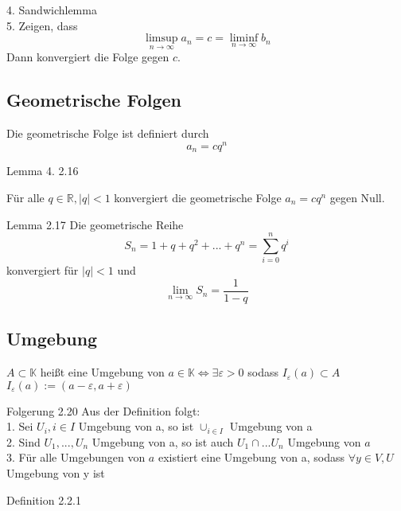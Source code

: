 \documentclass[smallheadings,headsepline,12pt,a4paper]{scrartcl}
\begin{document}
4. Sandwichlemma \\
5. Zeigen, dass $$\limsup\limits_{n \rightarrow \infty} a_n = c = \liminf\limits_{n \rightarrow \infty} b_n$$ Dann konvergiert die Folge gegen $c$. \\

\subsection*{Geometrische Folgen }

Die geometrische Folge ist definiert durch 
$$ a_n = cq^n$$

\item[Lemma 4. 2.16] 

Für alle $q\in \mathbb{R}, |q| < 1$ konvergiert die geometrische Folge $a_n = cq^n$ gegen Null. \\

\item[Lemma 2.17]
Die geometrische Reihe 
$$ S_n= 1+q+q^2+...+q^n = \sum\limits_{i=0}^n q^{i} $$
konvergiert für $|q| < 1$ und $$\lim\limits_{n \rightarrow \infty} S_n = \frac{1}{1-q} $$

\newpage

\subsection*{Umgebung}

$A\subset \mathbb{K}$ heißt eine Umgebung von $a \in \mathbb{K} \Leftrightarrow \exists \varepsilon > 0 $ sodass $I_{\varepsilon}(a) \subset A$ \\
$I_{\varepsilon}(a) := (a-\varepsilon,a+\varepsilon) $

\item[Folgerung 2.20]
Aus der Definition folgt: \\

1. Sei $U_i, i \in I$ Umgebung von a, so ist $\cup_{i \in I}$ Umgebung von a \\

2. Sind $U_1,...,U_n$ Umgebung von a, so ist auch $U_1 \cap ... U_n$ Umgebung von $a$ \\

3. Für alle Umgebungen von $a$ existiert eine Umgebung von a, sodass $ \forall y \in V,U$ Umgebung von y ist \\

\item[Definition 2.2.1]
\end{document}
